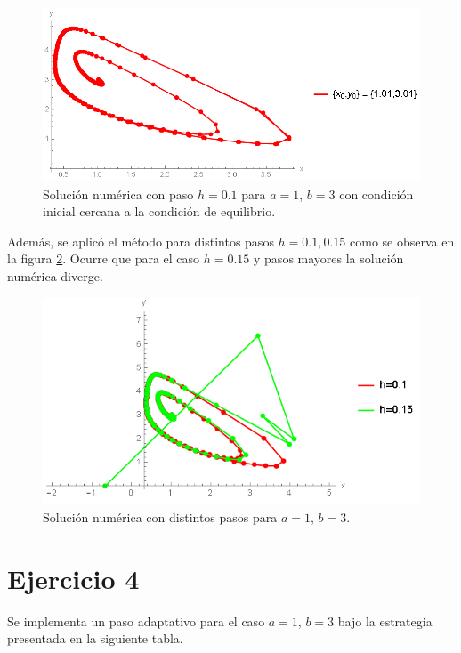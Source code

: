 \documentclass[aps,prb,twocolumn,superscriptaddress,floatfix,longbibliography]{revtex4-2}
\newcounter{para}
\begin{document}
\begin{figure}[h]
    \includegraphics[clip=true,width=\columnwidth]{3_b_x0_3.png}
    \caption{Solución numérica con paso $h = 0.1$ para $a = 1$, $b = 3$ con condición inicial cercana a la condición de equilibrio.}
     \label{fig:3_b_x0_3}
\end{figure}

Además, se aplicó el método para distintos pasos $h = 0.1, 0.15$ como se observa en la figura \ref{fig:3_b_h}. Ocurre que para el caso $h = 0.15$ y pasos mayores la solución numérica diverge.


\begin{figure}[h]
    \includegraphics[clip=true,width=\columnwidth]{3_b_h.png}
    \caption{Solución numérica con distintos pasos para $a = 1$, $b = 3$.}
     \label{fig:3_b_h}
\end{figure}


\section{Ejercicio 4}

Se implementa un paso adaptativo para el caso $a = 1$, $b =3$ bajo la estrategia presentada en la siguiente tabla.
\end{document}
